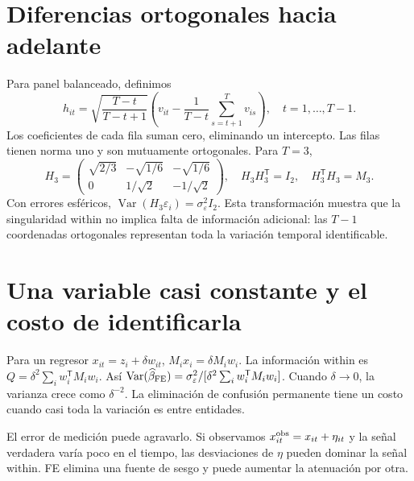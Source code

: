 \documentclass[11pt,a4paper]{article}
\newcommand{\T}{^{\mathsf T}}
\DeclareMathOperator{\Var}{Var}
\theoremstyle{definition}
\newcommand{\eps}{\varepsilon}
\begin{document}
\section{Diferencias ortogonales hacia adelante}
Para panel balanceado, definimos
\[
h_{it}=\sqrt{\frac{T-t}{T-t+1}}
\left(v_{it}-\frac1{T-t}\sum_{s=t+1}^T v_{is}\right),
\quad t=1,\ldots,T-1.
\]
Los coeficientes de cada fila suman cero, eliminando un intercepto. Las filas tienen norma uno y son mutuamente ortogonales. Para $T=3$,
\[
H_3=\begin{pmatrix}
\sqrt{2/3}&-\sqrt{1/6}&-\sqrt{1/6}\\
0&1/\sqrt2&-1/\sqrt2
\end{pmatrix},
\quad H_3H_3\T=I_2,\quad H_3\T H_3=M_3.
\]
Con errores esféricos, $\Var(H_3\eps_i)=\sigma_\eps^2I_2$.
Esta transformación muestra que la singularidad within no implica falta de información adicional: las $T-1$ coordenadas ortogonales representan toda la variación temporal identificable.

\section{Una variable casi constante y el costo de identificarla}
Para un regresor $x_{it}=z_i+\delta w_{it}$, $M_ix_i=\delta M_iw_i$.
La información within es
$Q=\delta^2\sum_iw_i\T M_iw_i$.
Así
$\Var(\widehat\beta_{\rm FE})=\sigma_\eps^2/[\delta^2\sum_iw_i\T M_iw_i]$.
Cuando $\delta\to0$, la varianza crece como $\delta^{-2}$. La eliminación de confusión permanente tiene un costo cuando casi toda la variación es entre entidades.

El error de medición puede agravarlo. Si observamos $x_{it}^{\rm obs}=x_{it}+\eta_{it}$ y la señal verdadera varía poco en el tiempo, las desviaciones de $\eta$ pueden dominar la señal within. FE elimina una fuente de sesgo y puede aumentar la atenuación por otra.
\end{document}
